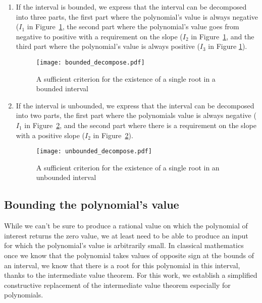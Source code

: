 \documentclass{article}
\begin{document}
\begin{enumerate}
\item If the interval is bounded, we express that the interval can be
  decomposed into three parts, the first part where the polynomial's
  value is always negative (\(I_1\) in Figure~\ref{bounded_decompose}, the second part where the polynomial's
  value goes from negative to positive with a requirement on the
  slope (\(I_2\) in Figure~\ref{bounded_decompose}, and the third part where the polynomial's value is always
  positive (\(I_3\) in Figure \ref{bounded_decompose}).
\begin{figure}\label{bounded_decompose}
\begin{center}
\texttt{[image: bounded\_decompose.pdf]}
\end{center}
\caption{A sufficient criterion for the existence of a single root in a bounded interval}
\end{figure}
\item If the interval is unbounded, we express that the interval can
  be decomposed into two parts, the first part where the polynomials
  value is always negative (\(I_1\) in
  Figure~\ref{unbounded_decompose}, and the second part where there is
  a requirement on the slope with a positive slope (\(I_2\) in
  Figure~\ref{unbounded_decompose}).
\begin{figure}\label{unbounded_decompose}
\begin{center}
\texttt{[image: unbounded\_decompose.pdf]}
\end{center}
\caption{A sufficient criterion for the existence of a single root in an unbounded interval}
\end{figure}
\end{enumerate}
\subsection{Bounding the polynomial's value}
While we can't be sure to produce a rational value on which the
polynomial of interest returns the zero value, we at least need to be
able to produce an input for which the polynomial's value is
arbitrarily small. In classical mathematics once we know that the
polynomial takes values of opposite sign at the bounds of an interval,
we know that there is a root for this polynomial in this interval,
thanks to the intermediate value theorem. For this work, we establish
a simplified constructive replacement of the intermediate value
theorem especially for polynomials.
\end{document}
